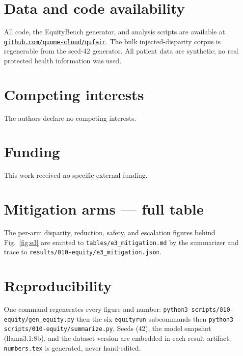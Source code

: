 \documentclass[11pt]{article}
\providecommand{\EoneModel}{llama3.1:8b}
\begin{document}
\section*{Data and code availability}
All code, the EquityBench generator, and analysis scripts are available at
\href{https://github.com/quome-cloud/qufair}{\nolinkurl{github.com/quome-cloud/qufair}}.
The bulk injected-disparity corpus is regenerable from the seed-42 generator. All
patient data are synthetic; no real protected health information was used.

\section*{Competing interests}
The authors declare no competing interests.

\section*{Funding}
This work received no specific external funding.

\appendix
\section{Mitigation arms --- full table}\label{app:tables}
The per-arm disparity, reduction, safety, and escalation figures behind
Fig.~\ref{fig:e3} are emitted to \texttt{tables/e3\_mitigation.md} by the
summarizer and trace to \texttt{results/010-equity/e3\_mitigation.json}.

\section{Reproducibility}
One command regenerates every figure and number:
\texttt{python3 scripts/010-equity/gen\_equity.py} then the six
\texttt{equityrun} subcommands then \texttt{python3
scripts/010-equity/summarize.py}. Seeds (42), the model snapshot (\EoneModel), and
the dataset version are embedded in each result artifact; \texttt{numbers.tex} is
generated, never hand-edited.

\clearpage


\end{document}
